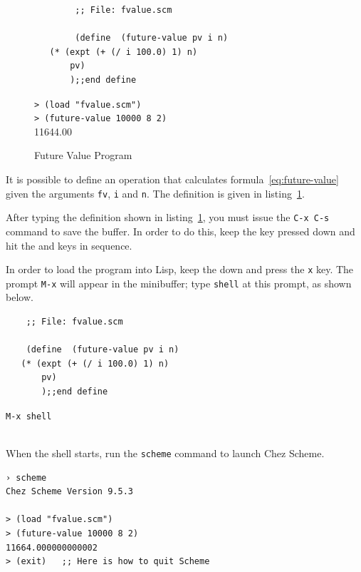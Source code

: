 \documentclass[a4paper,12pt]{book}
\newenvironment{fmpage}[1]
{\begin{lrbox}{\fmbox}\begin{minipage}{#1}}
{\end{minipage}\end{lrbox}\fbox{\usebox{\fmbox}}}
\begin{document}
\begin{figure}[!h]
	\begin{fmpage}{0.8\textwidth}
		\begin{verbatim}
		;; File: fvalue.scm

		(define  (future-value pv i n)
   (* (expt (+ (/ i 100.0) 1) n) 
       pv)
       );;end define
		\end{verbatim}
	\end{fmpage}

	\begin{fmpage}{0.8\textwidth}
		\verb|> (load "fvalue.scm")|\\
		\verb|> (future-value 10000 8 2)|\\
		11644.00
	\end{fmpage}
	\caption{Future Value Program}
	\label{Texan:parking}
\end{figure}


It is possible to define an operation that
calculates formula~\ref{eq:future-value}
given the arguments \verb|fv|, \verb|i|
and \verb|n|. The definition is given
in listing~\ref{Texan:parking}.

After typing the definition shown in listing~\ref{Texan:parking},
you must issue the \verb|C-x C-s| command to save the buffer.
In order to do this, keep the  key pressed down and
hit the  and  keys in sequence.

In order to load the program into Lisp, keep the  down
and press the \verb|x| key. The prompt \verb|M-x| will appear
in the minibuffer; type \verb|shell| at this prompt, as shown below.\\

\begin{fmpage}{0.8\textwidth}
	\begin{verbatim}
	;; File: fvalue.scm

	(define  (future-value pv i n)
   (* (expt (+ (/ i 100.0) 1) n) 
       pv)
       );;end define
	\end{verbatim}
\end{fmpage}

\begin{fmpage}{0.8\textwidth}
	\verb|M-x shell|\\
\end{fmpage}

\verb||\\
When the shell starts, run the \verb|scheme| command
to launch Chez Scheme.
\begin{verbatim}
› scheme
Chez Scheme Version 9.5.3

> (load "fvalue.scm")
> (future-value 10000 8 2)
11664.000000000002
> (exit)   ;; Here is how to quit Scheme
\end{verbatim}
\end{document}

